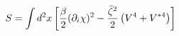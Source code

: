 \begin{equation}
S=  \int d^2x\left[\frac\beta2(\partial_i\chi)^2- {\bar\zeta
^2\over 2}\left(V^4+V^{*4}\right)\right]\label{dimred}\end{equation} 
